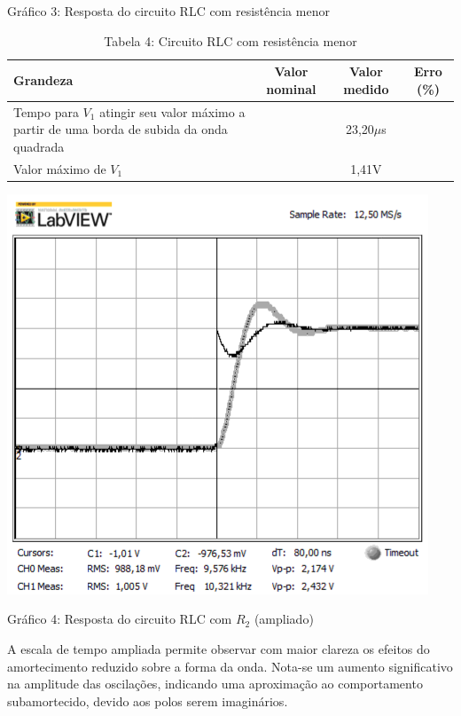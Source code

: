 \documentclass[a4 paper]{article}
\begin{document}
\begin{center}
Gráfico 3: Resposta do circuito RLC com resistência menor
\end{center}


\vspace{5pt}
\begin{table}[hb]
\centering
\begin{tabular}{|p{5cm}|c|c|c|}
\hline
Grandeza & Valor nominal & Valor medido & Erro (\%) \\\hline
Tempo para $V_1$ atingir seu valor máximo a partir de uma borda de subida da onda quadrada &  & 23,20$\mu$s & \\    \hline
\centering Valor máximo de $V_1$ &  & 1,41V & \\    \hline
\end{tabular}
\caption*{Tabela 4: Circuito RLC com resistência menor}
\end{table}

\newpage
\begin{table}[h]
\centering
\includegraphics[scale=0.6]{rgadicoas/rgadicoa4}
\end{table}

\begin{center}
Gráfico 4: Resposta do circuito RLC com $R_2$ (ampliado)
\end{center}

A escala de tempo ampliada permite observar com maior clareza os efeitos do amortecimento reduzido sobre a forma da onda. Nota-se um aumento significativo na amplitude das oscilações, indicando uma aproximação ao comportamento subamortecido, devido aos polos serem imaginários.
\end{document}
